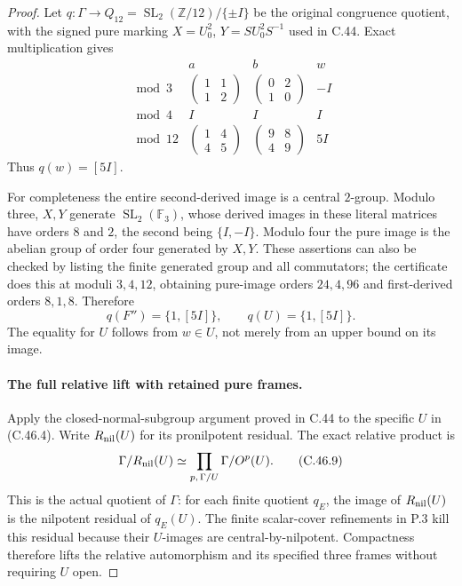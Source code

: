 \begin{proof}
Let $q:\Gamma\to Q_{12}=\operatorname{SL}_2(\mathbb Z/12)/\{\pm I\}$
be the original congruence quotient, with the signed pure marking
$X=U_0^2$, $Y=SU_0^2S^{-1}$ used in C.44. Exact multiplication gives
\[
\begin{array}{c|c|c|c}
 &a&b&w\\ \hline
 \bmod 3&\begin{pmatrix}1&1\\1&2\end{pmatrix}
 &\begin{pmatrix}0&2\\1&0\end{pmatrix}&-I\\[3pt]
 \bmod 4&I&I&I\\[3pt]
 \bmod 12&\begin{pmatrix}1&4\\4&5\end{pmatrix}
 &\begin{pmatrix}9&8\\4&9\end{pmatrix}&5I
\end{array}                                                   \tag{C.46.7}
\]
Thus $q(w)=[5I]$.

For completeness the entire second-derived image is a central
$2$-group. Modulo three, $X,Y$ generate
$\operatorname{SL}_2(\mathbb F_3)$, whose derived images in these
literal matrices have orders $8$ and $2$, the second being
$\{I,-I\}$. Modulo four the pure image is the abelian group of
order four generated by $X,Y$. These assertions can also be checked
by listing the finite generated group and all commutators; the
certificate does this at moduli $3,4,12$, obtaining pure-image orders
$24,4,96$ and first-derived orders $8,1,8$. Therefore
\[
       q(F'')=\{1,[5I]\},\qquad q(U)=\{1,[5I]\}.     \tag{C.46.8}
\]
The equality for $U$ follows from $w\in U$, not merely from an
upper bound on its image.

\paragraph{The full relative lift with retained pure frames.}
Apply the closed-normal-subgroup argument proved in C.44 to the
specific $U$ in (C.46.4). Write $R_{\rm nil}(U)$ for its
pronilpotent residual. The exact relative product is
\[
 \Gamma/R_{\rm nil}(U)
  \simeq\prod_{p,\,\Gamma/U}\Gamma/O^p(U).            \tag{C.46.9}
\]
This is the actual quotient of $\Gamma$: for each finite quotient
$q_E$, the image of $R_{\rm nil}(U)$ is the nilpotent residual
of $q_E(U)$. The finite scalar-cover refinements in P.3 kill this
residual because their $U$-images are central-by-nilpotent. Compactness
therefore lifts the relative automorphism and its specified three
frames without requiring $U$ open.


\end{proof}
